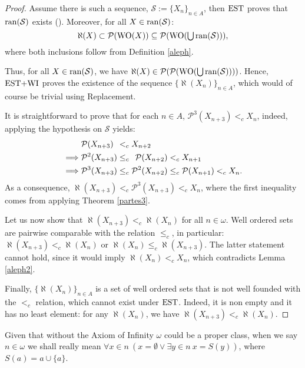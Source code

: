 \begin{proof}
	Assume there is such a sequence, 
	$\mathcal{S} := \{X_n\}_{n\in A}$,
	then $\operatorname{\text{EST}}$ proves that $\operatorname{ran}(\mathcal{S})$ exists (\cite[Def. I.6.6]{Kunen}).
	Moreover, for all $X\in\operatorname{ran}(\mathcal{S})$: 
	\[
	\aleph(X) \subset \mathcal{P}(\operatorname{WO}(X)) \subseteq \mathcal{P}(\operatorname{WO}(\mathop{\textstyle\bigcup} \operatorname{ran}(\mathcal{S}))),
	\]
	where both inclusions follow from Definition \ref{aleph}.
	
	\noindent Thus, for all $X\in\operatorname{ran}(\mathcal{S})$, we have $\aleph(X)\in\mathcal{P}(\mathcal{P}(\operatorname{WO}(\mathop{\textstyle\bigcup} \operatorname{ran}(\mathcal{S}))))$. Hence, $\operatorname{\text{EST+WI}}$ proves the existence of the sequence $\{\aleph(X_n)\}_{n\in A}$, which would of course be trivial using Replacement.
	
	It is straightforward to prove that for each $n\in A$, 
	$\mathcal{P}^{3}(X_{n+3}) <_c X_n$, 
	indeed, applying the hypothesis on $\mathcal{S}$ yields:
	\begin{align*}
		&\mathcal{P}(X_{n+3}) \hspace{4.5 pt} <_c X_{n+2}
		\\ \implies &\mathcal{P}^2(X_{n+3}) \leq_c \hspace{4.5 pt} \mathcal{P}(X_{n+2}) <_c X_{n+1}
		\\ \implies &\mathcal{P}^3(X_{n+3}) \leq_c \mathcal{P}^{2}(X_{n+2}) \leq_c \mathcal{P}(X_{n+1}) <_c X_n.
	\end{align*}
	As a consequence,
	$\aleph(X_{n+3}) <_c \mathcal{P}^{3}(X_{n+3}) <_c X_n$, where the first inequality comes from applying Theorem \ref{partes3}.
	
	\noindent Let us now show that $\aleph(X_{n+3}) <_c \aleph(X_n)$ for all $n\in\omega$. Well ordered sets are pairwise comparable with the relation $\leq_c$, in particular: $\aleph(X_{n+3}) <_c \aleph(X_n)$ or $\aleph(X_n) \leq_c \aleph(X_{n+3})$. The latter statement cannot hold, since it would imply $\aleph(X_n) <_c X_n$, which contradicts Lemma \ref{aleph2}.
	
	Finally, $\{\aleph(X_n)\}_{n\in A}$
	is a set of well ordered sets that is not well founded with the $<_c$ relation, which cannot exist under $\operatorname{\text{EST}}$. Indeed, 
	it is non empty and it has no least element: for any $\aleph(X_n)$, we have $\aleph(X_{n+3}) <_c \aleph(X_n)$.
	
\end{proof}

\begin{notation}
	Given that without the Axiom of Infinity $\omega$ could be a proper class, when we say $n\in\omega$ we shall really mean $\forall x\in n \ (x = \emptyset \lor \exists y \in n \ x = S(y))$, where $S(a) = a \cup \{a\}$.
\end{notation}

